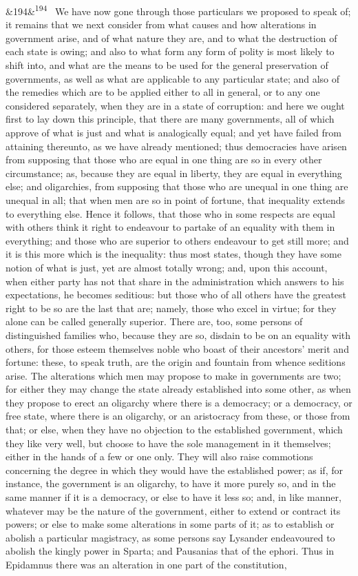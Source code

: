 \documentclass[12pt]{article}
\newcommand{\para}[1][]{\par\noindent\ifx&#1&\else\textsuperscript{\footnotesize #1}~\fi}
\begin{document}
\para[194] We have now gone through those particulars we proposed to speak of; it remains that we next consider from what causes and how alterations in government arise, and of what nature they are, and to what the destruction of each state is owing; and also to what form any form of polity is most likely to shift into, and what are the means to be used for the general preservation of governments, as well as what are applicable to any particular state; and also of the remedies which are to be applied either to all in general, or to any one considered separately, when they are in a state of corruption: and here we ought first to lay down this principle, that there are many governments, all of which approve of what is just and what is analogically equal; and yet have failed from attaining thereunto, as we have already mentioned; thus democracies have arisen from supposing that those who are equal in one thing are so in every other circumstance; as, because they are equal in liberty, they are equal in everything else; and oligarchies, from supposing that those who are unequal in one thing are unequal in all; that when men are so in point of fortune, that inequality extends to everything else. Hence it follows, that those who in some respects are equal with others think it right to endeavour to partake of an equality with them in everything; and those who are superior to others endeavour to get still more; and it is this more which is the inequality: thus most states, though they have some notion of what is just, yet are almost totally wrong; and, upon this account, when either party has not that share in the administration which answers to his expectations, he becomes seditious: but those who of all others have the greatest right to be so are the last that are; namely, those who excel in virtue; for they alone can be called generally superior. There are, too, some persons of distinguished families who, because they are so, disdain to be on an equality with others, for those esteem themselves noble who boast of their ancestors' merit and fortune: these, to speak truth, are the origin and fountain from whence seditions arise. The alterations which men may propose to make in governments are two; for either they may change the state already established into some other, as when they propose to erect an oligarchy where there is a democracy; or a democracy, or free state, where there is an oligarchy, or an aristocracy from these, or those from that; or else, when they have no objection to the established government, which they like very well, but choose to have the sole management in it themselves; either in the hands of a few or one only. They will also raise commotions concerning the degree in which they would have the established power; as if, for instance, the government is an oligarchy, to have it more purely so, and in the same manner if it is a democracy, or else to have it less so; and, in like manner, whatever may be the nature of the government, either to extend or contract its powers; or else to make some alterations in some parts of it; as to establish or abolish a particular magistracy, as some persons say Lysander endeavoured to abolish the kingly power in Sparta; and Pausanias that of the ephori. Thus in Epidamnus there was an alteration in one part of the constitution, 
\end{document}
